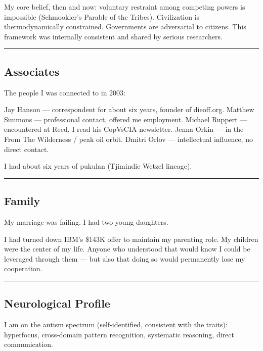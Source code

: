 \medskip

My core belief, then and now: voluntary restraint among competing powers is impossible (Schmookler's Parable of the Tribes). Civilization is thermodynamically constrained. Governments are adversarial to citizens. This framework was internally consistent and shared by serious researchers.

\vspace{1cm}\hrule\vspace{1cm}

\subsection*{Associates}
\label{record:tgt-associates}

The people I was connected to in 2003:

Jay Hanson --- correspondent for about six years, founder of dieoff.org. Matthew Simmons --- professional contact, offered me employment. Michael Ruppert --- encountered at Reed, I read his CopVsCIA newsletter. Jenna Orkin --- in the From The Wilderness / peak oil orbit. Dmitri Orlov --- intellectual influence, no direct contact.

I had about six years of pukulan (Tjimindie Wetzel lineage).

\vspace{1cm}\hrule\vspace{1cm}

\subsection*{Family}
\label{record:tgt-family-vulnerabilities}

My marriage was failing. I had two young daughters.

I had turned down IBM's \$143K offer to maintain my parenting role. My children were the center of my life. Anyone who understood that would know I could be leveraged through them --- but also that doing so would permanently lose my cooperation.

\vspace{1cm}\hrule\vspace{1cm}

\subsection*{Neurological Profile}
\label{record:tgt-neurological-profile}

I am on the autism spectrum (self-identified, consistent with the traits): hyperfocus, cross-domain pattern recognition, systematic reasoning, direct communication.


